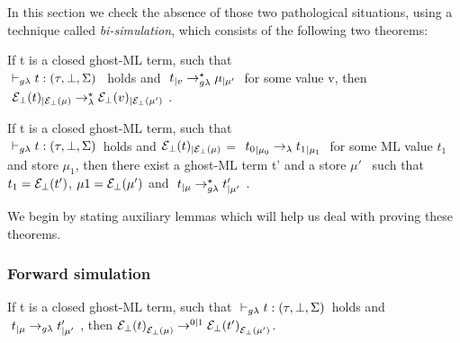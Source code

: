 

In this section we check the absence of those two pathological situations,
using a technique called \textit{bi-simulation}, which consists of 
the following two theorems:

\begin{theorem}
If t is a closed ghost-ML term, such that\\ 
$\typrule{t}{\tau}{\bot}{\Sigma}$ ~holds and $~t_{|v} \rightarrow_{g\lambda}^{\star} \mu_{|\mu'} ~$ 
for some value v, then\\ 
$~\mathcal{E}_{\bot}(t)_{|\mathcal{E}_{\bot}(\mu)} \rightarrow_{\lambda}^{\star} \mathcal{E}_{\bot}(v)_{|\mathcal{E}_{\bot}(\mu')} ~$.
\end{theorem}

\begin{theorem}
If t is a closed ghost-ML term, such that 
\\ $\typrule{t}{\tau}{\bot}{\Sigma}$~holds and 
$\mathcal{E}_{\bot}(t)_{|\mathcal{E}_{\bot}(\mu)}$ = $~{t_0}_{|{\mu_0}} \rightarrow_{\lambda} {t_{1}}_{|\mu_1} ~$ 
for some ML value $t_1$ and store $\mu_1$, 
then there exist a ghost-ML term t' and a store $\mu'$~
such that $t_1 =\mathcal{E}_{\bot}(t')$, $\mu1 = \mathcal{E}_{\bot}(\mu')$ and 
$~t_{|\mu} \rightarrow_{g\lambda}^{\star} t'_{|\mu'} ~$.
\end{theorem}

We begin by stating auxiliary lemmas which will help us deal with proving these theorems.
 
\subsubsection{Forward simulation}

\begin{lemma}
If t is a closed ghost-ML term, such that $\typrule{t}{\tau}{\bot}{\Sigma}$~holds 
and $~t_{|\mu} \rightarrow_{g\lambda} t'_{|\mu'} ~$, then 
${\mathcal{E}_{\bot}(t)}_{\mathcal{E}_{\bot}(\mu)} \rightarrow^{0|1} {\mathcal{E}_{\bot}(t')}_{\mathcal{E}_{\bot}(\mu')}$.
\end{lemma}




